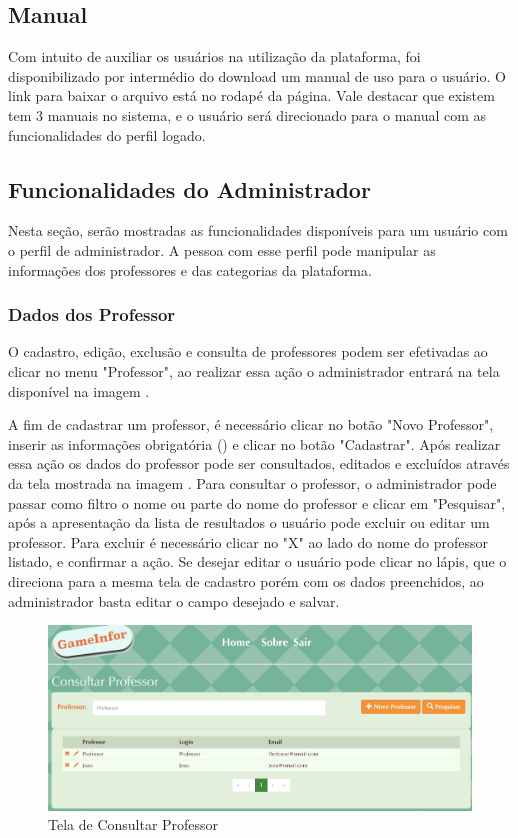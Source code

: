 \subsection{Manual}

Com intuito de auxiliar os usuários na utilização da plataforma, foi disponibilizado por intermédio do download um manual de uso para o usuário. O link para baixar o arquivo está no rodapé da página. Vale destacar que existem tem 3 manuais no sistema, e o usuário será direcionado para o manual com as funcionalidades do perfil logado.

\subsection{Funcionalidades do Administrador}

Nesta seção, serão mostradas as funcionalidades disponíveis para um usuário com o perfil de administrador. A pessoa com esse perfil pode manipular as informações dos professores e das categorias da plataforma.
\subsubsection{Dados dos Professor}
O cadastro, edição, exclusão e consulta de professores podem ser efetivadas ao clicar no menu "Professor", ao realizar essa ação o administrador entrará na tela disponível na imagem . 

A fim de cadastrar um professor, é necessário clicar no botão "Novo Professor", inserir as informações obrigatória () e clicar no botão "Cadastrar". Após realizar essa ação os dados do professor pode ser consultados, editados e excluídos através da tela mostrada na imagem . Para consultar o professor, o administrador pode passar como filtro o nome ou parte do nome do professor e clicar em "Pesquisar", após a apresentação da lista de resultados o usuário pode excluir ou editar um professor. Para excluir é necessário clicar no  "X" ao lado do nome do professor listado, e confirmar a ação. Se desejar editar o usuário pode clicar no lápis, que o direciona para a mesma tela de cadastro porém com os dados preenchidos, ao administrador basta editar o campo desejado e salvar.

\begin{figure}[H]
  \centering
  \includegraphics[scale=0.4]{images/proposta-img/Figura4-15.png}
  \caption{Tela de Consultar Professor}
  \label{fig:Figura4-15}
\end{figure}

